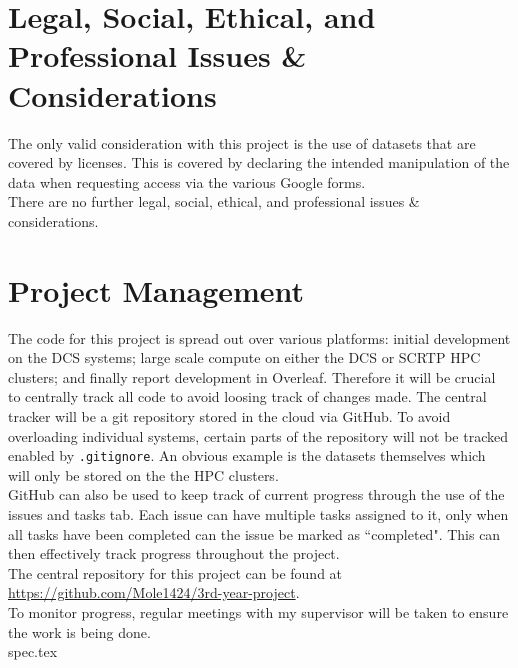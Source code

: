 \documentclass{article}
\begin{document}
\section{Legal, Social, Ethical, and Professional Issues \& Considerations}

The only valid consideration with this project is the use of datasets that are covered by licenses. This is covered by declaring the intended manipulation of the data when requesting access via the various Google forms.\\

There are no further legal, social, ethical, and professional issues \& considerations.

\section{Project Management}

The code for this project is spread out over various platforms: initial development on the DCS systems; large scale compute on either the DCS or SCRTP HPC clusters; and finally report development in Overleaf. Therefore it will be crucial to centrally track all code to avoid loosing track of changes made. The central tracker will be a git repository stored in the cloud via GitHub. To avoid overloading individual systems, certain parts of the repository will not be tracked enabled by \verb|.gitignore|. An obvious example is the datasets themselves which will only be stored on the the HPC clusters.\\

GitHub can also be used to keep track of current progress through the use of the issues and tasks tab. Each issue can have multiple tasks assigned to it, only when all tasks have been completed can the issue be marked as ``completed". This can then effectively track progress throughout the project.\\

The central repository for this project can be found at \url{https://github.com/Mole1424/3rd-year-project}.\\

To monitor progress, regular meetings with my supervisor will be taken to ensure the work is being done.\\




\newpage
\appendix
{spec.tex}
\end{document}
